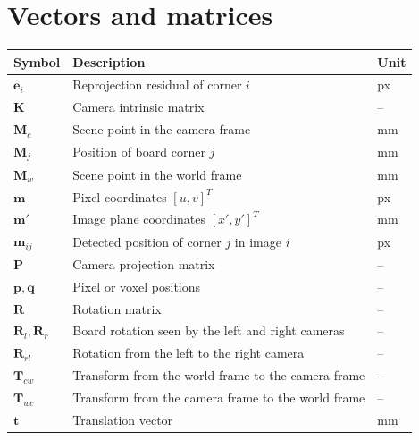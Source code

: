 \section*{Vectors and matrices}
\noindent
\begin{tabularx}{\textwidth}{@{}l X U@{}}
\toprule
\textbf{Symbol} & \textbf{Description} & \textbf{Unit} \\
\midrule
$\mathbf{e}_i$                       & Reprojection residual of corner $i$                  & px \\
$\mathbf{K}$                         & Camera intrinsic matrix                              & -- \\
$\mathbf{M}_c$                       & Scene point in the camera frame                      & mm \\
$\mathbf{M}_j$                       & Position of board corner $j$                         & mm \\
$\mathbf{M}_w$                       & Scene point in the world frame                       & mm \\
$\mathbf{m}$                         & Pixel coordinates $[u, v]^T$                         & px \\
$\mathbf{m}'$                        & Image plane coordinates $[x', y']^T$                 & mm \\
$\mathbf{m}_{ij}$                    & Detected position of corner $j$ in image $i$         & px \\
$\mathbf{P}$                         & Camera projection matrix                             & -- \\
$\mathbf{p}, \mathbf{q}$             & Pixel or voxel positions                             & -- \\
$\mathbf{R}$                         & Rotation matrix                                      & -- \\
$\mathbf{R}_l, \mathbf{R}_r$         & Board rotation seen by the left and right cameras    & -- \\
$\mathbf{R}_{rl}$                    & Rotation from the left to the right camera           & -- \\
$\mathbf{T}_{cw}$                    & Transform from the world frame to the camera frame   & -- \\
$\mathbf{T}_{wc}$                    & Transform from the camera frame to the world frame   & -- \\
$\mathbf{t}$                         & Translation vector                                   & mm \\

\end{tabularx}
